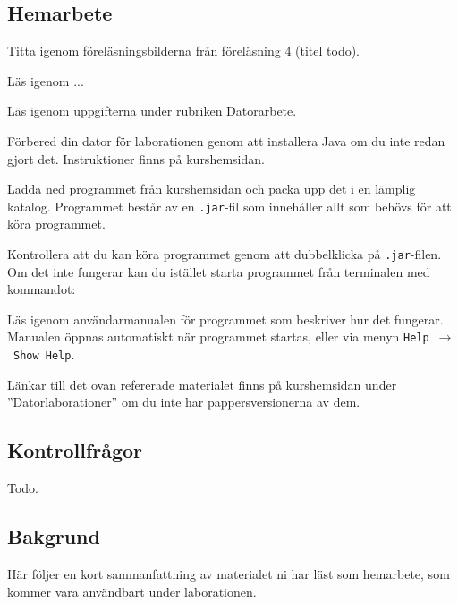 \subsection*{Hemarbete}
\begin{Hemarbete}\firmlist
    \item Titta igenom föreläsningsbilderna från föreläsning 4 (titel todo).
    \item Läs igenom ...
    \item Läs igenom uppgifterna under rubriken Datorarbete.
    \item Förbered din dator för laborationen genom att installera Java om du inte redan gjort det. Instruktioner finns på kurshemsidan.
    \item Ladda ned programmet \textbf{\progname{}} från kurshemsidan och packa upp det i en lämplig katalog. Programmet består av en \texttt{.jar}-fil som innehåller allt som behövs för att köra programmet.
    \item Kontrollera att du kan köra programmet genom att dubbelklicka på \texttt{.jar}-filen. Om det inte fungerar kan du istället starta programmet från terminalen med kommandot:
    \begin{center}
        {}
    \end{center}
    \item Läs igenom användarmanualen för programmet som beskriver hur det fungerar. Manualen öppnas automatiskt när programmet startas, eller via menyn \texttt{Help}~$\rightarrow$~\texttt{Show Help}.
\end{Hemarbete}
Länkar till det ovan refererade materialet finns på kurshemsidan under  ''Datorlaborationer'' om du inte har pappersversionerna av dem.

\subsection*{Kontrollfrågor}
\begin{Kontrollfragor}
    \item Todo.
\end{Kontrollfragor}

\subsection*{Bakgrund}
Här följer en kort sammanfattning av materialet ni har läst som hemarbete, som kommer vara användbart under laborationen.

% 

